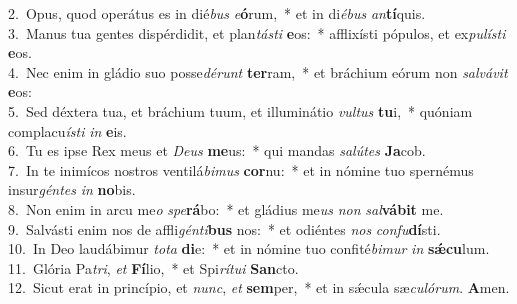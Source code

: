 {2.~}Opus, quod operátus es in dié\textit{bus} \textit{e}\textbf{ó}rum,~* et in di\textit{é}\textit{bus} \textit{an}\textbf{tí}quis.\\
{3.~}Manus tua gentes dispérdidit, et plan\textit{tá}\textit{sti} \textbf{e}os:~* afflixísti pópulos, et ex\textit{pu}\textit{lí}\textit{sti} \textbf{e}os.\\
{4.~}Nec enim in gládio suo posse\textit{dé}\textit{runt} \textbf{ter}ram,~* et bráchium eórum non \textit{sal}\textit{vá}\textit{vit} \textbf{e}os:\\
{5.~}Sed déxtera tua, et bráchium tuum, et illuminátio \textit{vul}\textit{tus} \textbf{tu}i,~* quóniam complacu\textit{í}\textit{sti} \textit{in} \textbf{e}is.\\
{6.~}Tu es ipse Rex meus et \textit{De}\textit{us} \textbf{me}us:~* qui mandas \textit{sa}\textit{lú}\textit{tes} \textbf{Ja}cob.\\
{7.~}In te inimícos nostros ventilá\textit{bi}\textit{mus} \textbf{cor}nu:~* et in nómine tuo spernémus insur\textit{gén}\textit{tes} \textit{in} \textbf{no}bis.\\
{8.~}Non enim in arcu me\textit{o} \textit{spe}\textbf{rá}bo:~* et gládius me\textit{us} \textit{non} \textit{sal}\textbf{vá}\textbf{bit} me.\\
{9.~}Salvásti enim nos de affli\textit{gén}\textit{ti}\textbf{bus} nos:~* et odiéntes \textit{nos} \textit{con}\textit{fu}\textbf{dí}sti.\\
{10.~}In Deo laudábimur \textit{to}\textit{ta} \textbf{di}e:~* et in nómine tuo confité\textit{bi}\textit{mur} \textit{in} \textbf{sǽ}\textbf{cu}lum.\\
{11.~}Glória Pa\textit{tri}, \textit{et} \textbf{Fí}lio,~* et Spi\textit{rí}\textit{tu}\textit{i} \textbf{San}cto.\\
{12.~}Sicut erat in princípio, et \textit{nunc}, \textit{et} \textbf{sem}per,~* et in sǽcula sæ\textit{cu}\textit{ló}\textit{rum}. \textbf{A}men.\\
